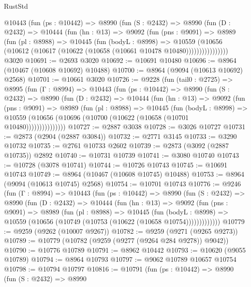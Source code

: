 \begin{lexlean}{RustStd}
\begin{coremodule}
        @10443
          (fun (ps : @10442) =>
          @8990
            (fun (S : @2432) =>
            @8990
              (fun (D : @2432) =>
              @10444
                (fun (hn : @13) =>
                @9092
                  (fun (pns : @9091) =>
                  @8989
                    (fun (pl : @8988) =>
                    @10445
                      (fun (bodyL : @8998) =>
                      @10559
                        (@10656
                          (@10612 (@10617 (@10622 (@10658 (@10661 @10478 @10480))))))))))))))))
    @3020
@10691 := @2693 @3020
@10692 := @10691 @10480
@10696 := @8964 (@10467 (@10608 @10692) @10488)
@10700 := @8964 (@9094 (@10613 @10692) @2568)
@10701 := @10661 @3020
@10726 := @9228
    (fun (tail0 : @2725) =>
    @8995
      (fun (Γ : @8994) =>
      @10443
        (fun (ps : @10442) =>
        @8990
          (fun (S : @2432) =>
          @8990
            (fun (D : @2432) =>
            @10444
              (fun (hn : @13) =>
              @9092
                (fun (pns : @9091) =>
                @8989
                  (fun (pl : @8988) =>
                  @10445
                    (fun (bodyL : @8998) =>
                    @10559 (@10656 (@10696 (@10700 (@10622 (@10658 (@10701 @10480)))))))))))))))
@10727 := @2887 @3038
@10728 := @3026 @10727
@10731 := @2873 (@2904 (@2887 @3084))
@10732 := @2771 @3145
@10733 := @3290 @10732
@10735 := @2761 @10733 @2602
@10739 := @2873 (@3092 (@2887 @10735)) @2892
@10740 := @10731 @10739
@10741 := @3080 @10740
@10743 := @10728 (@3078 @10741)
@10744 := @10726 @10743
@10745 := @10691 @10743
@10749 := @8964 (@10467 (@10608 @10745) @10488)
@10753 := @8964 (@9094 (@10613 @10745) @2568)
@10754 := @10701 @10743
@10776 := @9246
    (fun (Γ : @8994) =>
    @10443
      (fun (ps : @10442) =>
      @8990
        (fun (S : @2432) =>
        @8990
          (fun (D : @2432) =>
          @10444
            (fun (hn : @13) =>
            @9092
              (fun (pns : @9091) =>
              @8989
                (fun (pl : @8988) =>
                @10445
                  (fun (bodyL : @8998) =>
                  @10559 (@10656 (@10749 (@10753 (@10622 (@10658 @10754)))))))))))))
@10779 := @9259 (@9262 (@10007 @9267))
@10782 := @9259 (@9271 (@9265 @9273))
@10789 := @10779 (@10782 (@9259 (@9277 (@9264 @284 @9278)) @9042))
@10790 := @10776 @10789
@10791 := @8962 @10442
@10793 := @10620 (@9055 @10789)
@10794 := @8964 @10793
@10797 := @9062 @10789 @10657 @10754
@10798 := @10794 @10797
@10816 := @10791
    (fun (ps : @10442) =>
    @8990
      (fun (S : @2432) =>
      @8990

\end{coremodule}
\end{lexlean}
